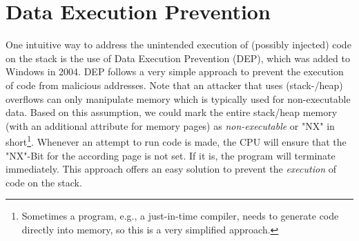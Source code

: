 \documentclass[10pt,twocolumn,a4paper]{article}
\begin{document}
\section{Data Execution Prevention}\label{sec:DEP}
One intuitive way to address the unintended execution of (possibly injected) code on the stack is the use of Data Execution Prevention (DEP), which was added to Windows in 2004\cite{DEP}.
DEP follows a very simple approach to prevent the execution of code from malicious addresses.
Note that an attacker that uses (stack-/heap) overflows can only manipulate memory which is typically used for non-executable data.
Based on this assumption, we could mark the entire stack/heap memory (with an additional attribute for memory pages) as \emph{non-executable} or "NX" in short\footnote{Sometimes a program, e.g., a just-in-time compiler, needs to generate code directly into memory, so this is a very simplified approach.}.
Whenever an attempt to run code is made, the CPU will ensure that the "NX"-Bit for the according page is not set. If it is, the program will terminate immediately\cite{DEP}.
This approach offers an easy solution to prevent the \emph{execution} of code on the stack.
\end{document}
